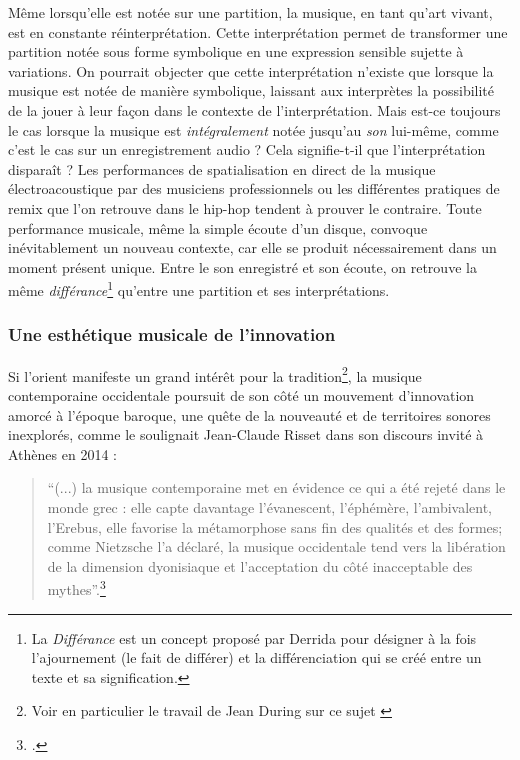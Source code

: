 \indent Même lorsqu'elle est notée sur une partition, la musique, en tant qu'art vivant, est en constante réinterprétation. Cette interprétation permet de transformer une partition notée sous forme symbolique en une expression sensible sujette à variations. On pourrait objecter que cette interprétation n'existe que lorsque la musique est notée de manière symbolique, laissant aux interprètes la possibilité de la jouer à leur façon dans le contexte de l'interprétation. Mais est-ce toujours le cas lorsque la musique est \textit{intégralement} notée jusqu'au \textit{son} lui-même, comme c'est le cas sur un enregistrement audio ? Cela signifie-t-il que l'interprétation disparaît ? Les performances de spatialisation en direct de la musique électroacoustique par des musiciens professionnels ou les différentes pratiques de remix que l'on retrouve dans le hip-hop tendent à prouver le contraire. Toute performance musicale, même la simple écoute d'un disque, convoque inévitablement un nouveau contexte, car elle se produit nécessairement dans un moment présent unique. Entre le son enregistré et son écoute, on retrouve la même \textit{différance}\footnote{La \textit{Différance} est un concept proposé par Derrida \cite{derrida_lecriture_2014} pour désigner à la fois l'ajournement (le fait de différer) et la différenciation qui se créé entre un texte et sa signification.} qu'entre une partition et ses interprétations.

\subsubsection{Une esthétique musicale de l'innovation}

\noindent Si l'orient manifeste un grand intérêt pour la tradition\footnote{Voir en particulier le travail de Jean During sur ce sujet \cite{during_quelque_1994}}, la musique contemporaine occidentale poursuit de son côté un mouvement d'innovation amorcé à l'époque baroque, une quête de la nouveauté et de territoires sonores inexplorés, comme le soulignait Jean-Claude Risset dans son discours invité à Athènes en 2014 :
\blockquote{``(...) la musique contemporaine met en évidence ce qui a été rejeté dans le monde grec : elle capte davantage l'évanescent, l'éphémère, l'ambivalent, l'Erebus, elle favorise la métamorphose sans fin des qualités et des formes; comme Nietzsche l'a déclaré, la musique occidentale tend vers la libération de la dimension dyonisiaque et l'acceptation du côté inacceptable des mythes''.\footnote{ \cite{risset_sound_2014}.}}

